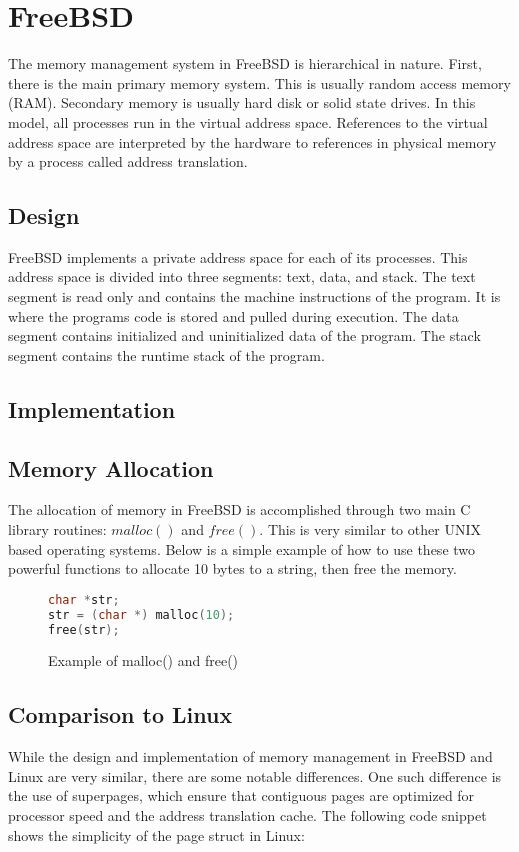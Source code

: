 \documentclass[letterpaper,draftclsnofoot,10pt,onecolumn,titlepage]{IEEEtran}\usepackage[margin=0.75in]{geometry}
\begin{document}
\section{FreeBSD}
The memory management system in FreeBSD is hierarchical in nature. First, there is the main primary memory system.
This is usually random access memory (RAM). Secondary memory is usually hard disk or solid state drives. In 
this model, all processes run in the virtual address space. References to the virtual address space are 
interpreted by the hardware to references in physical memory by a process called address translation.


\subsection{Design}
FreeBSD implements a private address space for each of its processes. This address space is divided into three 
segments: text, data, and stack. The text segment is read only and contains the machine instructions of 
the program. It is where the programs code is stored and pulled during execution. The data segment 
contains initialized and uninitialized data of the program. The stack segment contains the runtime stack 
of the program.


\subsection{Implementation}

\subsection{Memory Allocation}
The allocation of memory in FreeBSD is accomplished through two main C library routines: $malloc()$ and $free()$.
This is very similar to other UNIX based operating systems. Below is a simple example of how to use these 
two powerful functions to allocate 10 bytes to a string, then free the memory.

\begin{figure}[H]
\caption{Example of malloc() and free()}
\begin{lstlisting}[language=C++]
char *str;
str = (char *) malloc(10);
free(str);
\end{lstlisting}
\end{figure}


\subsection{Comparison to Linux}
While the design and implementation of memory management in FreeBSD and Linux are very similar, there are 
some notable differences. One such difference is the use of superpages, which ensure that contiguous pages 
are optimized for processor speed and the address translation cache. The following code snippet shows the 
simplicity of the page struct in Linux:
\end{document}

